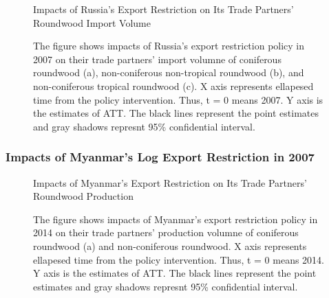 \documentclass[a4paper,12pt]{article}
\begin{document}
\begin{figure}[H] 
    \centering
    \caption{Impacts of Russia's Export Restriction on Its Trade Partners' Roundwood Import Volume}
    \caption*{\small{The figure shows impacts of Russia's export restriction policy in 2007 on their trade partners' import volumne of coniferous roundwood (a), non-coniferous non-tropical roundwood (b), and non-coniferous tropical roundwood (c). X axis represents ellapesed time from the policy intervention. Thus, t = 0 means 2007. Y axis is the estimates of ATT. The black lines represent the point estimates and gray shadows represnt 95\% confidential interval.}}
    \label{fig:att_imp_Russia}
\end{figure}

\subsubsection*{Impacts of Myanmar's Log Export Restriction in 2007}

\begin{figure}[H] 
    \centering
    \caption{Impacts of Myanmar's Export Restriction on Its Trade Partners' Roundwood Production}
    \caption*{\small{The figure shows impacts of Myanmar's export restriction policy in 2014 on their trade partners' production volumne of coniferous roundwood (a) and non-coniferous roundwood. X axis represents ellapesed time from the policy intervention. Thus, t = 0 means 2014. Y axis is the estimates of ATT. The black lines represent the point estimates and gray shadows represnt 95\% confidential interval.}}
    \label{fig:att_prod_Myanmar}
\end{figure}
\end{document}
